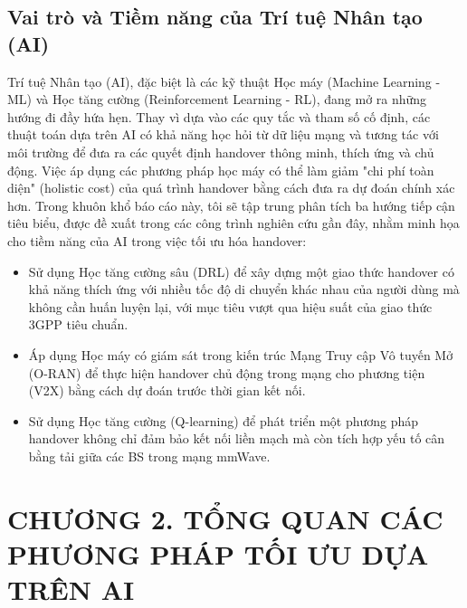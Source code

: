\documentclass{article} %
\begin{document}
\subsection{Vai trò và Tiềm năng của Trí tuệ Nhân tạo (AI)}
Trí tuệ Nhân tạo (AI), đặc biệt là các kỹ thuật Học máy (Machine Learning - ML) và Học tăng cường (Reinforcement Learning - RL), đang mở ra những hướng đi đầy hứa hẹn. Thay vì dựa vào các quy tắc và tham số cố định, các thuật toán dựa trên AI có khả năng học hỏi từ dữ liệu mạng và tương tác với môi trường để đưa ra các quyết định handover thông minh, thích ứng và chủ động. Việc áp dụng các phương pháp học máy có thể làm giảm "chi phí toàn diện" (holistic cost) của quá trình handover bằng cách đưa ra dự đoán chính xác hơn.
Trong khuôn khổ báo cáo này, tôi sẽ tập trung phân tích ba hướng tiếp cận tiêu biểu, được đề xuất trong các công trình nghiên cứu gần đây, nhằm minh họa cho tiềm năng của AI trong việc tối ưu hóa handover:
\begin{itemize}
    \item Sử dụng Học tăng cường sâu (DRL) để xây dựng một giao thức handover có khả năng thích ứng với nhiều tốc độ di chuyển khác nhau của người dùng mà không cần huấn luyện lại, với mục tiêu vượt qua hiệu suất của giao thức 3GPP tiêu chuẩn.
    \item Áp dụng Học máy có giám sát trong kiến trúc Mạng Truy cập Vô tuyến Mở (O-RAN) để thực hiện handover chủ động trong mạng cho phương tiện (V2X) bằng cách dự đoán trước thời gian kết nối.
    \item Sử dụng Học tăng cường (Q-learning) để phát triển một phương pháp handover không chỉ đảm bảo kết nối liền mạch mà còn tích hợp yếu tố cân bằng tải giữa các BS trong mạng mmWave.
\end{itemize}
\newpage
\section*{CHƯƠNG 2. TỔNG QUAN CÁC PHƯƠNG PHÁP TỐI ƯU DỰA TRÊN AI}
\setcounter{section}{2}
\setcounter{subsection}{0}
\setcounter{figure}{0}
\setcounter{table}{0}
\end{document}

